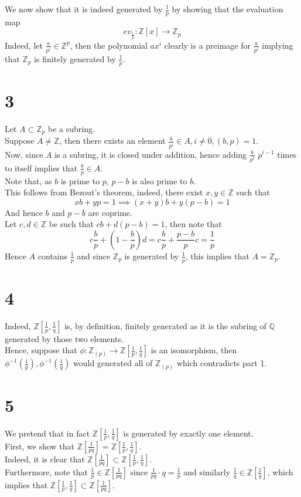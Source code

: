 \documentclass[11pt, a4paper]{article}
\begin{document}
We now show that it is indeed generated by $ \frac{1}{p}$ by showing that the evaluation map
\[ 
	ev_{\frac{1}{p}} : \mathbb{Z}[x ] \to \mathbb{Z}_p
\]
Indeed, let $ \frac{a}{p^{i}}\in \mathbb{Z}^{p}$, then the polynomial $ a x^{i}$ clearly is a preimage for $ \frac{a}{p^{i}}$ implying that $ \mathbb{Z}_p$ is finitely generated by $ \frac{1}{p}$.
\section*{3}
Let $ A \subset \mathbb{Z}_p$ be a subring.\\
Suppose $ A \neq \mathbb{Z}$, then there exists an element $ \frac{b}{p^{i}}\in A, i \neq 0, ( b,p) =1$.\\
Now, since $A$ is a subring, it is closed under addition, hence adding $ \frac{b}{p^{i}}$ $ p^{i-1}$ times to itself implies that $ \frac{b}{p}\in A$.\\
Note that, as $ b$ is prime to $p$, $  p-b$ is also prime to $b$.\\
This follows from Bezout's theorem, indeed, there exist $ x,y \in \mathbb{Z}$ such that
\[ 
xb + y p = 1 \implies  ( x+y) b + y ( p-b)  = 1
\]
And hence $ b$ and $p-b$ are coprime.\\
Let $c,d\in \mathbb{Z}$ be such that $ cb + d ( p-b) = 1$, then note that
\[ 
c \frac{b}{p} + ( 1- \frac{b}{p}) d = c \frac{b}{p} + \frac{p-b}{p}c = \frac{1}{p}
\]
Hence $ A$ contains $ \frac{1}{p}$ and since $ \mathbb{Z}_p$ is generated by $ \frac{1}{p}$, this implies that $ A = \mathbb{Z}_p$.
\section*{4}
Indeed, $ \mathbb{Z}\left[\frac{1}{p}, \frac{1}{q}\right]$ is, by definition, finitely generated as it is the subring of $ \mathbb{Q}$ generated by those two elements.\\
Hence, suppose that $ \phi:\mathbb{Z}_{ ( p) }\to \mathbb{Z} \left[ \frac{1}{p}, \frac{1}{q}\right] $ is an isomorphism, then $ \phi^{-1}( \frac{1}{p}), \phi^{-1}( \frac{1}{q})  $ would generated all of $ \mathbb{Z}_{ ( p) } $ which contradicts part 1.
\section*{5}
We pretend that in fact $ \mathbb{Z}\left[ \frac{1}{p}, \frac{1}{q}\right]$ is generated by exactly one element.\\
First, we show that $ \mathbb{Z}[ \frac{1}{pq}]= \mathbb{Z}\left[ \frac{1}{p}, \frac{1}{q}\right]$.\\
Indeed, it is clear that $ \mathbb{Z}[ \frac{1}{pq}] \subset \mathbb{Z} \left[  \frac{1}{p}, \frac{1}{q}\right] $.\\
Furthermore, note that $ \frac{1}{p}\in \mathbb{Z}\left[ \frac{1}{pq}\right] $ since $ \frac{1}{pq}\cdot q = \frac{1}{p}$ and similarly $ \frac{1}{q}\in \mathbb{Z}\left[\frac{1}{q}\right] $, which implies that $ \mathbb{Z}\left[\frac{1}{p}, \frac{1}{q}\right] \subset \mathbb{Z}\left[\frac{1}{pq}\right]$.\\
\end{document}
